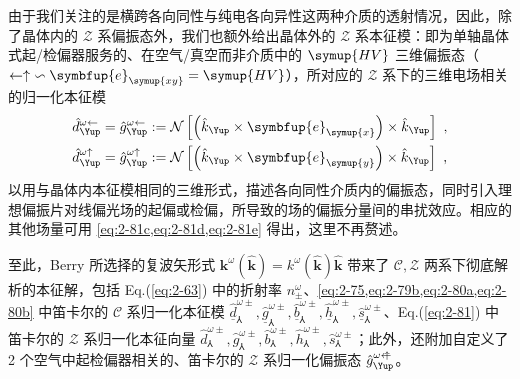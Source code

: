由于我们关注的是横跨各向同性与纯电各向异性这两种介质的透射情况，因此，除了晶体内的 $\mathcal{Z}$ 系偏振态外，我们也额外给出晶体外的 $\mathcal{Z}$ 系本征模：即为单轴晶体式起/检偏器服务的、在空气/真空而非介质中的 $\symup{HV}$ 三维偏振态（$\leftarrow \uparrow\ \backsim \symbfup{e}_{\symup{xy}} = \symup{HV}$），所对应的 $\mathcal{Z}$ 系下的三维电场相关的归一化本征模
\begin{subequations} \label{eq:2-82}
\begin{align}
	\hat{d}^{\omega \leftarrow}_{\Yup} = \hat{g}^{\omega \leftarrow}_{\Yup} &:= \mathcal{N} \left[ \left( \hat{k}_{\Yup} \times \symbfup{e}_{\symup{x}} \right) \times \hat{k}_{\Yup} \right] \label{eq:2-82a}~,\\ \hat{d}^{\omega \uparrow}_{\Yup} = \hat{g}^{\omega \uparrow}_{\Yup} &:= \mathcal{N} \left[ \left( \hat{k}_{\Yup} \times \symbfup{e}_{\symup{y}} \right) \times \hat{k}_{\Yup} \right] \label{eq:2-82b}~,
\end{align}
\end{subequations}
以用与晶体内本征模相同的三维形式，描述各向同性介质内的偏振态，同时引入理想偏振片对线偏光场的起偏或检偏，所导致的场的偏振分量间的串扰效应\cite{zhangNonparaxialIdealizedPolarizer2018}。相应的其他场量可用 \cref{eq:2-81c,eq:2-81d,eq:2-81e} 得出，这里不再赘述。

至此，Berry 所选择的复波矢形式 ${\symbf k}^\omega \left( \hat{\symbf k} \right) = k^\omega \left( \hat{\symbf k} \right) \hat{\symbf k}$ 带来了 $\mathcal{C,Z}$ 两系下彻底解析的本征解，包括 Eq.(\ref{eq:2-63}) 中的折射率 $n^{\omega}_{\pm}$、\cref{eq:2-75,eq:2-79b,eq:2-80a,eq:2-80b} 中笛卡尔的 $\mathcal{C}$ 系归一化本征模 $\hat{\underline{d}}^{\omega\pm}_{\Yup}, \hat{\underline{g}}^{\omega\pm}_{\Yup}, \hat{\underline{b}}^{\omega\pm}_{\Yup}, \hat{\underline{h}}^{\omega\pm}_{\Yup}, \hat{\underline{s}}^{\omega\pm}_{\Yup}$、Eq.(\ref{eq:2-81}) 中笛卡尔的 $\mathcal{Z}$ 系归一化本征向量 $\hat{d}^{\omega\pm}_{\Yup}, \hat{g}^{\omega\pm}_{\Yup}, \hat{b}^{\omega\pm}_{\Yup}, \hat{h}^{\omega\pm}_{\Yup}, \hat{s}^{\omega\pm}_{\Yup}$；此外，还附加自定义了 2 个空气中起检偏器相关的、笛卡尔的 $\mathcal{Z}$ 系归一化偏振态 $\hat{g}^{\omega \leftarrow\hspace{-0.525em}\uparrow}_{\Yup}$。

